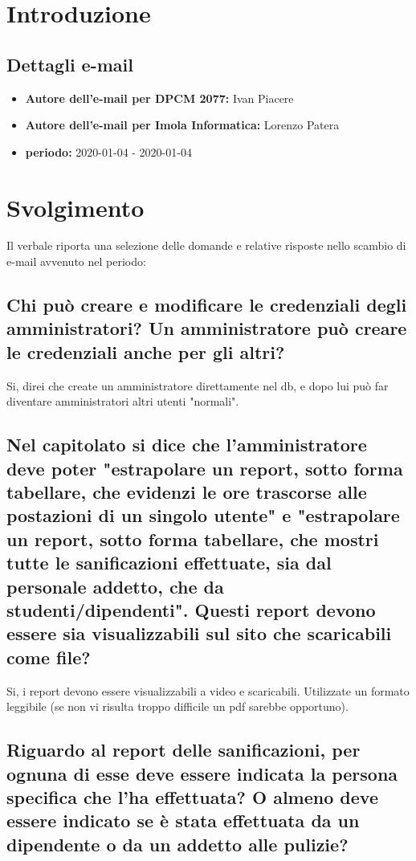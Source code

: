 \section*{Introduzione}
\subsection*{Dettagli e-mail}
\begin{itemize}
	\item \textbf{Autore dell'e-mail per DPCM 2077:} Ivan Piacere
	\item \textbf{Autore dell'e-mail per Imola Informatica:} Lorenzo Patera
	\item \textbf{periodo:} 2020-01-04 - 2020-01-04
\end{itemize}

\section*{Svolgimento}
Il verbale riporta una selezione delle domande e relative risposte nello scambio di e-mail avvenuto nel periodo: %
\subsection*{Chi può creare e modificare le credenziali degli amministratori? Un amministratore può creare le credenziali anche per gli altri?}

Si, direi che create un amministratore direttamente nel db, e dopo lui può far diventare amministratori altri utenti "normali".

\subsection*{Nel capitolato si dice che l'amministratore deve poter "estrapolare un report, sotto forma tabellare, che evidenzi le ore trascorse alle postazioni di un singolo utente" e "estrapolare un report, sotto forma tabellare, che mostri tutte le sanificazioni effettuate, sia dal personale addetto, che da studenti/dipendenti". Questi report devono essere sia visualizzabili sul sito che scaricabili come file?}

Si, i report devono essere visualizzabili a video e scaricabili. Utilizzate un formato leggibile (se non vi risulta troppo difficile un pdf sarebbe opportuno).

\subsection{Riguardo al report delle sanificazioni, per ognuna di esse deve essere indicata la persona specifica che l'ha effettuata? O almeno deve essere indicato se è stata effettuata da un dipendente o da un addetto alle pulizie?}

